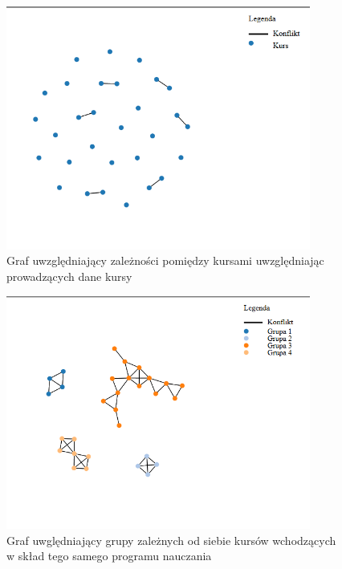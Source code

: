 \begin{figure}[H]
  \caption{Graf uwzględniający zależności pomiędzy kursami uwzględniając prowadzących dane kursy}
  \centering
    \includegraphics[width=10cm]{test1_teach.PNG}
\end{figure}
\begin{figure}[H]
  \caption{Graf uwględniający grupy zależnych od siebie kursów wchodzących w skład tego samego programu nauczania}
  \centering
    \includegraphics[width=10cm]{test1_con.PNG}
\end{figure}
